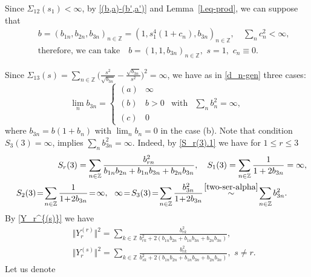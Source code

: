 \documentclass[preprint,12pt]{elsarticle}
\numberwithin{equation}{section}
\begin{document}
\begin{rem}
\label{r.Sigma-123=(011)} 
 Since $\Sigma_{12}(s_1)\!<\!\infty$, by \eqref{(b,a)-(b',a')} and  Lemma~\ref{l.eq-prod}, we can suppose that 
\begin{eqnarray*}
&&
 b\!=\!(b_{1n},b_{2n},b_{3n})_{n\in \mathbb Z}\!=\!(1,s_1^4(1\!+\!c_n),b_{3n})_{n\in \mathbb Z},\quad
\sum_nc_n^2<\infty,\\
&&
\text{therefore, we can take}\quad
b=(1,1,b_{3n})_{n\in \mathbb Z},\,\,s=1,\,\,c_n\equiv 0.
\end{eqnarray*}
\end{rem}
Since $\Sigma_{13}(s)=
\sum_{n\in \mathbb Z}\Big(
\frac{s^2}{\sqrt{b_{3n}}}-
\frac{\sqrt{b_{3n}}}{s^2}
\Big)^2=\infty$,
we have as in \eqref{d_n-gen} three cases:
\begin{equation}
\label{b_(3n)-gen}
\lim_nb_{3n}=\!\left\{\begin{array}{clcc}
(a)& \infty&&\\
(b)&b>0&\text{with}&
\sum_nb_n^2=\infty,\\
(c)&0&&
\end{array}\right.
\end{equation}
where $b_{3n}=b(1+b_n)$ with $\lim_nb_n=0$ in the case (b).
%
Note that condition $S_3(3)=\infty$, implies  $\sum_nb_{3n}^2=\infty$. 
Indeed, by \eqref{S_r(3).1} we have for $1\leq r\leq 3$
\begin{eqnarray}
\nonumber
&& 
S_r(3)=\sum_{n\in \mathbb Z}\frac{b_{rn}^2}{b_{1n}b_{2n}+b_{1n}b_{3n}+b_{2n}b_{3n}},\quad
S_1(3)=\sum_{n\in \mathbb Z}\frac{1}{1+2b_{3n}}=\infty,\\
\label{S_3(3)=}
&&
S_2(3)\!=\!\sum_{n\in \mathbb Z}\frac{1}{1\!+\!2b_{3n}}\!=\!\infty,\,\,\,\, 
\infty\!=\!S_3(3)\!=\!\sum_{n\in \mathbb Z}\frac{b_{3n}^2}{1\!+\!2b_{3n}}\!\stackrel{\eqref{two-ser-alpha}}{\sim} \!\sum_{n\in \mathbb Z}b_{3n}^2.\qquad\,\, 
\end{eqnarray}
%
By \eqref{Y_r^{(s)}} we have
\begin{eqnarray*}
&& \Vert Y_r^{(r)}\Vert^2 =\sum_{k\in \mathbb Z}\frac{b_{rk}^2}{b_{rk}^2+2(b_{1n}b_{2n}+b_{1n}b_{3n}+b_{2n}b_{3n})},\\
&& \Vert Y_r^{(s)}\Vert^2 =\sum_{k\in \mathbb Z}\frac{b_{rk}^2}{b_{sk}^2+2(b_{1n}b_{2n}+b_{1n}b_{3n}+b_{2n}b_{3n})},\,\,s\not=r.
\end{eqnarray*}
Let us denote
\end{document}
